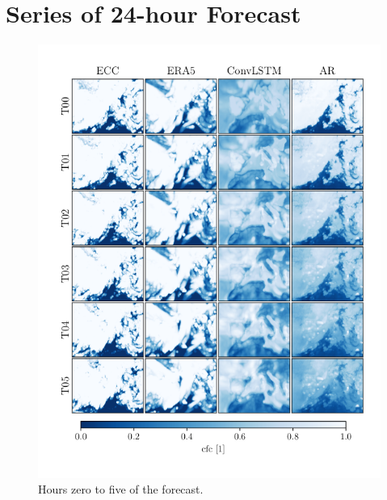 \chapter{Series of 24-hour Forecast} \label{app:pred_sequence}
\begin{figure}[ht]
    \centering
    \includegraphics{python_figs/comparing_seq_part_1_of4_jan2.png}
    \caption{Hours zero to five of the forecast.}
    \label{fig:part1/4}
\end{figure}
